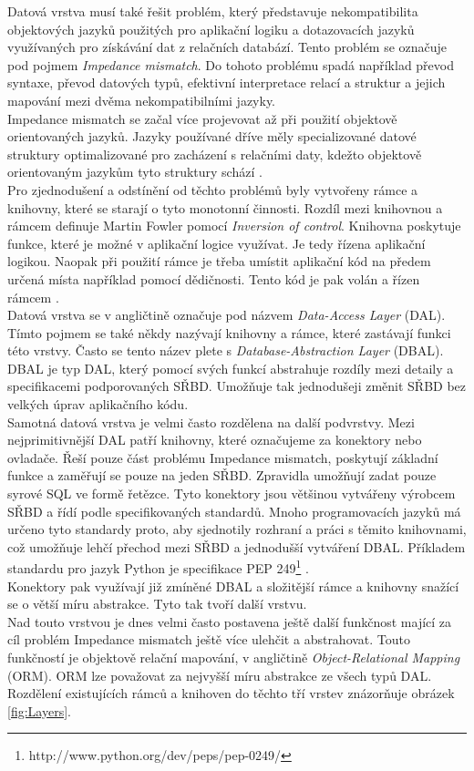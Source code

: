 \documentclass[ing,male,java,dept456]{diploma}						%
\begin{document}
Datová vrstva musí také řešit problém, který představuje nekompatibilita objektových jazyků použitých pro aplikační logiku a dotazovacích jazyků využívaných pro získávání dat z relačních databází. Tento problém se označuje pod pojmem \textit{Impedance mismatch}. Do tohoto problému spadá například převod syntaxe, převod datových typů, efektivní interpretace relací a struktur a jejich mapování mezi dvěma nekompatibilními jazyky. \\
Impedance mismatch se začal více projevovat až při použití objektově orientovaných jazyků. Jazyky používané dříve měly specializované datové struktury optimalizované pro zacházení s relačními daty, kdežto objektově orientovaným jazykům tyto struktury schází \cite{dbprogrammer}. \\

Pro zjednodušení a odstínění od těchto problémů byly vytvořeny rámce a knihovny, které se starají o tyto monotonní činnosti. Rozdíl mezi knihovnou a rámcem definuje Martin Fowler pomocí \textit{Inversion of control}. Knihovna poskytuje funkce, které je možné v aplikační logice využívat. Je tedy řízena aplikační logikou. Naopak při použití rámce je třeba umístit aplikační kód na předem určená místa například pomocí dědičnosti. Tento kód je pak volán a řízen rámcem \cite{fowler-ioc}.  \\

Datová vrstva se v angličtině označuje pod názvem \textit{Data-Access Layer} (DAL). Tímto pojmem se také někdy nazývají knihovny a rámce, které zastávají funkci této vrstvy. Často se tento název plete s \textit{Database-Abstraction Layer} (DBAL). DBAL je typ DAL, který pomocí svých funkcí abstrahuje rozdíly mezi detaily a specifikacemi podporovaných SŘBD. Umožňuje tak jednodušeji změnit SŘBD bez velkých úprav aplikačního kódu. \\

Samotná datová vrstva je velmi často rozdělena na další podvrstvy. Mezi nejprimitivnější DAL patří knihovny, které označujeme za konektory nebo ovladače. Řeší pouze část problému Impedance mismatch, poskytují základní funkce a zaměřují se pouze na jeden SŘBD. Zpravidla umožňují zadat pouze syrové SQL ve formě řetězce. Tyto konektory jsou většinou vytvářeny výrobcem SŘBD a řídí podle specifikovaných standardů. Mnoho programovacích jazyků má určeno tyto standardy proto, aby sjednotily rozhraní a práci s těmito knihovnami, což umožňuje lehčí přechod mezi SŘBD a jednodušší vytváření DBAL. Příkladem standardu pro jazyk Python je specifikace PEP 249\footnote{http://www.python.org/dev/peps/pep-0249/} .\\
Konektory pak využívají již zmíněné DBAL a složitější rámce a knihovny snažící se o větší míru abstrakce. Tyto tak tvoří další vrstvu. \\
Nad touto vrstvou je dnes velmi často postavena ještě další funkčnost mající za cíl problém Impedance mismatch ještě více ulehčit a abstrahovat. Touto funkčností je objektově relační mapování, v angličtině \textit{Object-Relational Mapping} (ORM). ORM lze považovat za nejvyšší míru abstrakce ze všech typů DAL.  \\
Rozdělení existujících rámců a knihoven do těchto tří vrstev znázorňuje obrázek \ref{fig:Layers}.
\end{document}
